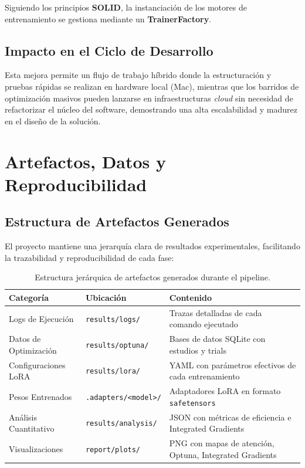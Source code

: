 Siguiendo los principios \textbf{SOLID}, la instanciación de los motores de entrenamiento se gestiona mediante un \textbf{TrainerFactory}.



\subsection{Impacto en el Ciclo de Desarrollo}

Esta mejora permite un flujo de trabajo híbrido donde la estructuración y pruebas rápidas se realizan en hardware local (Mac), mientras que los barridos de optimización masivos pueden lanzarse en infraestructuras \textit{cloud} sin necesidad de refactorizar el núcleo del software, demostrando una alta escalabilidad y madurez en el diseño de la solución.

\section{Artefactos, Datos y Reproducibilidad}

\subsection{Estructura de Artefactos Generados}

El proyecto mantiene una jerarquía clara de resultados experimentales, facilitando la trazabilidad y reproducibilidad de cada fase:

\begin{table}[H]
    \centering
    \small
    \begin{tabularx}{\textwidth}{|l|X|X|}
        \hline
        \textbf{Categoría} & \textbf{Ubicación} & \textbf{Contenido} \\ \hline
        Logs de Ejecución & \texttt{results/logs/} & Trazas detalladas de cada comando ejecutado \\ \hline
        Datos de Optimización & \texttt{results/optuna/} & Bases de datos SQLite con estudios y trials \\ \hline
        Configuraciones LoRA & \texttt{results/lora/} & YAML con parámetros efectivos de cada entrenamiento \\ \hline
        Pesos Entrenados & \texttt{.adapters/<model>/} & Adaptadores LoRA en formato \texttt{safetensors} \\ \hline
        Análisis Cuantitativo & \texttt{results/analysis/} & JSON con métricas de eficiencia e Integrated Gradients \\ \hline
        Visualizaciones & \texttt{report/plots/} & PNG con mapas de atención, Optuna, Integrated Gradients \\ \hline
    \end{tabularx}
    \caption{Estructura jerárquica de artefactos generados durante el pipeline.}
    \label{tab:artefactos_generados}
\end{table}

